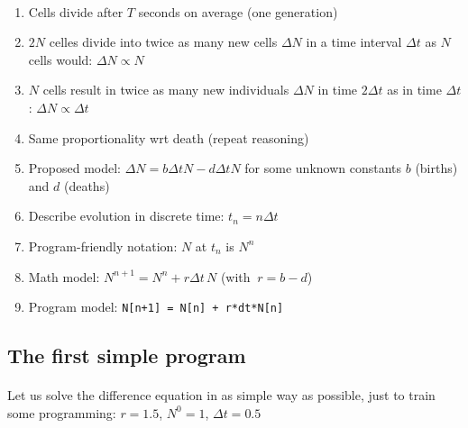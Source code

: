 \documentclass[%
twoside,                 %
final,                   %
10pt]{article}
\begin{document}


\paragraph{}
\begin{enumerate}
\item Cells divide after $T$ seconds on average (one generation)

\item $2N$ celles divide into twice as many new cells $\Delta N$ in a time
   interval $\Delta t$ as $N$ cells would: $\Delta N \propto N$

\item $N$ cells result in twice as many new individuals $\Delta N$ in
   time $2\Delta t$ as in time $\Delta t$: $\Delta N \propto\Delta t$

\item Same proportionality wrt death (repeat reasoning)

\item Proposed model: $\Delta N = b\Delta t N - d\Delta tN$ for some unknown
   constants $b$ (births) and $d$ (deaths)

\item Describe evolution in discrete time: $t_n=n\Delta t$

\item Program-friendly notation: $N$ at $t_n$ is $N^n$

\item Math model: $N^{n+1} = N^n + r\Delta t\, N$ (with $\ r=b-d$)

\item Program model: \Verb!N[n+1] = N[n] + r*dt*N[n]!
\end{enumerate}

\noindent



\subsection{The first simple program}


\paragraph{}
Let us solve the difference equation in as simple way as possible,
just to train some programming: $r=1.5$, $N^0=1$, $\Delta t=0.5$
\end{document}
